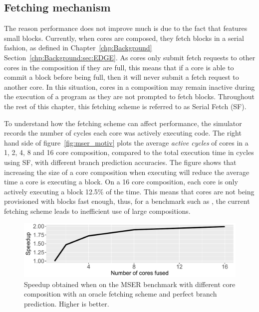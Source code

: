 \subsection{Fetching mechanism}
The reason performance does not improve much is due to the fact that  features small blocks.
Currently, when cores are composed, they fetch blocks in a serial fashion, as defined in Chapter~\ref{chp:Background} Section~\ref{chp:Background:sec:EDGE}.
As cores only submit fetch requests to other cores in the composition if they are full, this means that if a core is able to commit a block before being full, then it will never submit a fetch request to another core.
In this situation, cores in a composition may remain inactive during the execution of a program as they are not prompted to fetch blocks.
Throughout the rest of this chapter, this fetching scheme is referred to as Serial Fetch (SF).%

To understand how the fetching scheme can affect performance, the simulator records the number of cycles each core was actively executing code.
The right hand side of figure~\ref{fig:mser_motiv} plots the average \textit{active cycles} of cores in a 1, 2, 4, 8 and 16 core composition, compared to the total execution time in cycles using SF, with different branch prediction accuracies.
The figure shows that increasing the size of a core composition when executing  will reduce the average time a core is executing a block.
On a 16 core composition, each core is only actively executing a block 12.5\% of the time.
This means that cores are not being provisioned with blocks fast enough, thus, for a benchmark such as , the current fetching scheme leads to inefficient use of large compositions.

\begin{figure}[t]
    \centering
    \includegraphics[width=1\textwidth]{chapter3/graphics/perfect_fetch_motiv.pdf}
    \caption{Speedup obtained when on the MSER benchmark with different core composition with an oracle fetching scheme and perfect branch prediction. Higher is better. }
    \label{fig:motivation_fetch}
	\vspace{1em}
\end{figure}

